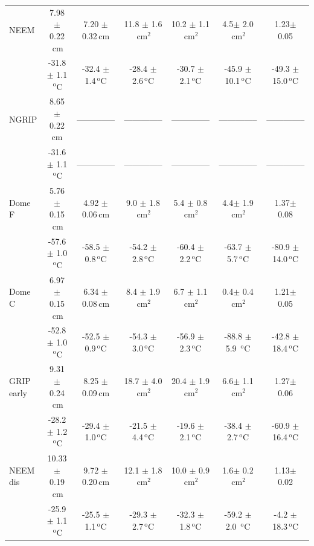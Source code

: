\documentclass[11pt, draftcls, onecolumn]{IEEEtran} %
\numberwithin{equation}{section}
\numberwithin{table}{section}
\numberwithin{figure}{section}
\begin{document}
\begin{table}[]
\begin{tabular}{l c c c c c c}
		NEEM&7.98 $\pm$ 0.22$\,\mathrm{cm}$& 7.20 $\pm$ 0.32$\,\mathrm{cm}$& 11.8 $\pm$ 1.6$\,\mathrm{cm}^2$& 10.2 $\pm$ 1.1$\,\mathrm{cm}^2$& 4.5$\pm$ 2.0$\,\mathrm{cm}^2$& 1.23$\pm$ 0.05\\
		& -31.8 $\pm$ 1.1$\,^\mathrm{o}$C & -32.4 $\pm$ 1.4$\,^\mathrm{o}$C& -28.4 $\pm$ 2.6$\,^\mathrm{o}$C& -30.7 $\pm$ 2.1$\,^\mathrm{o}$C& -45.9 $\pm$ 10.1$\,^\mathrm{o}$C& -49.3 $\pm$ 15.0$\,^\mathrm{o}$C\\
		
		NGRIP &8.65 $\pm$ 0.22 $\mathrm{cm}$&-------------- &--------------&-------------- & --------------&-------------- \\
		& -31.6 $\pm$ 1.1$\,^\mathrm{o}$C &--------------& --------------& --------------& --------------&--------------\\	
	
		Dome F&5.76 $\pm$ 0.15$\,\mathrm{cm}$& 4.92 $\pm$ 0.06$\,\mathrm{cm}$& 9.0 $\pm$ 1.8$\,\mathrm{cm}^2$& 5.4 $\pm$ 0.8$\,\mathrm{cm}^2$& 4.4$\pm$ 1.9$\,\mathrm{cm}^2$& 1.37$\pm$ 0.08\\
		& -57.6 $\pm$ 1.0$\,^\mathrm{o}$C & -58.5 $\pm$ 0.8$\,^\mathrm{o}$C& -54.2 $\pm$ 2.8$\,^\mathrm{o}$C& -60.4 $\pm$ 2.2$\,^\mathrm{o}$C& -63.7 $\pm$ 5.7$\,^\mathrm{o}$C& -80.9 $\pm$ 14.0$\,^\mathrm{o}$C\\

		Dome C &6.97 $\pm$ 0.15$\,\mathrm{cm}$& 6.34 $\pm$ 0.08$\,\mathrm{cm}$& 8.4 $\pm$ 1.9$\,\mathrm{cm}^2$& 6.7 $\pm$ 1.1$\,\mathrm{cm}^2$& 0.4$\pm$ 0.4$\,\mathrm{cm}^2$& 1.21$\pm$ 0.05\\
		& -52.8 $\pm$ 1.0 $\,^\mathrm{o}$C & -52.5 $\pm$ 0.9$\,^\mathrm{o}$C& -54.3 $\pm$ 3.0$\,^\mathrm{o}$C& -56.9 $\pm$ 2.3$\,^\mathrm{o}$C& -88.8 $\pm$ 5.9 $\,^\mathrm{o}$C& -42.8 $\pm$ 18.4$\,^\mathrm{o}$C\\
	
		GRIP early &9.31 $\pm$ 0.24$\,\mathrm{cm}$& 8.25 $\pm$ 0.09$\,\mathrm{cm}$& 18.7 $\pm$ 4.0$\,\mathrm{cm}^2$& 20.4 $\pm$ 1.9$\,\mathrm{cm}^2$& 6.6$\pm$ 1.1$\,\mathrm{cm}^2$& 1.27$\pm$ 0.06\\
		& -28.2 $\pm$ 1.2$\,^\mathrm{o}$C & -29.4 $\pm$ 1.0$\,^\mathrm{o}$C& -21.5 $\pm$ 4.4$\,^\mathrm{o}$C& -19.6 $\pm$ 2.1$\,^\mathrm{o}$C& -38.4 $\pm$ 2.7$\,^\mathrm{o}$C& -60.9 $\pm$ 16.4$\,^\mathrm{o}$C\\
	
		NEEM dis &10.33 $\pm$ 0.19$\,\mathrm{cm}$& 9.72 $\pm$ 0.20$\,\mathrm{cm}$& 12.1 $\pm$ 1.8$\,\mathrm{cm}^2$& 10.0 $\pm$ 0.9$\,\mathrm{cm}^2$& 1.6$\pm$ 0.2$\,\mathrm{cm}^2$& 1.13$\pm$ 0.02\\
		& -25.9 $\pm$ 1.1$\,^\mathrm{o}$C & -25.5 $\pm$ 1.1$\,^\mathrm{o}$C& -29.3 $\pm$ 2.7$\,^\mathrm{o}$C& -32.3 $\pm$ 1.8$\,^\mathrm{o}$C& -59.2 $\pm$ 2.0 $\,^\mathrm{o}$C& -4.2 $\pm$ 18.3$\,^\mathrm{o}$C\\
	

\end{tabular}
\end{table}
\end{document}
